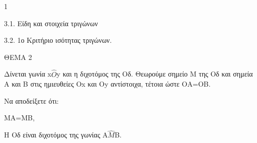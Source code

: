 \begin{ylh}{1}
    \item 3.1. Είδη και στοιχεία τριγώνων
    \item 3.2. 1ο Κριτήριο ισότητας τριγώνων.
\end{ylh}

ΘΕΜΑ 2

Δίνεται γωνία x$\widehat{O}$y και η διχοτόμος της Οδ. Θεωρούμε σημείο Μ της Οδ και σημεία Α και Β στις ημιευθείες Οx και Oy αντίστοιχα, τέτοια ώστε ΟΑ=ΟΒ.

Να αποδείξετε ότι:

\begin{alist}
\item MA=MB, 

\item Η Οδ είναι διχοτόμος της γωνίας Α$\widehat{Μ}$Β. 
\end{alist}
